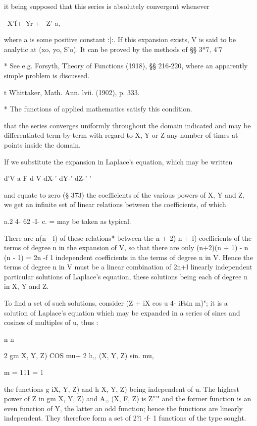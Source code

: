 it being supposed that this series is absolutely convergent whenever

\ X'f+\ Yr + \ Z' a,

where a is some positive constant :]:. If this expansion exists, V is
said to be analytic at (xo, yo, S'o). It can be proved by the methods
of §§ 3*7, 4'7

* See e.g. Forsyth, Theory of Functions (1918), §§ 216-220, where an
apparently simple problem is discussed.

t Whittaker, Math. Ann. lvii. (1902), p. 333.

* The functions of applied mathematics satisfy this condition.

%
%

that the series converges uniformly throughout the domain indicated
and may be differentiated term-by-term with regard to X, Y or Z any
number of times at points inside the domain.

If we substitute the expansion in Laplace's equation, which may be
written

d'V a F d V dX-' dY-' dZ-' '

and equate to zero (§ 373) the coefficients of the various powers of
X, Y and Z, we get an infinite set of linear relations between the
coefficients, of which

a.2 4- 62 -I- c. = may be taken as typical.

There are n(n - l) of these relations* between the n + 2) n + l)
coefficients of the terms of degree n in the expansion of V, so that
there are only (n+2)(n + 1) - n (n - 1) = 2n -f 1 independent
coefficients in the terms of degree n in V. Hence the terms of degree
n in V must be a linear combination of 2n+l linearly independent
particular solutions of Laplace's equation, these solutions being each
of degree n in X, Y and Z.

To find a set of such solutions, consider (Z + iX cos u 4- iFsin m)";
it is a solution of Laplace's equation which may be expanded in a
series of sines and cosines of multiples of u, thus :

n n

2 gm X, Y, Z) COS mu+ 2 h,, (X, Y, Z) sin. mu,

m = 111 = 1

the functions g iX, Y, Z) and h X, Y, Z) being independent of u. The
highest power of Z in gm X, Y, Z) and A,, (X, F, Z) is Z"'" and the
former function is an even function of Y, the latter an odd function;
hence the functions are linearly independent. They therefore form a
set of 2?i -f- 1 functions of the type sought.

